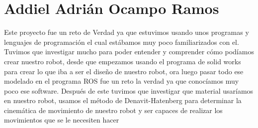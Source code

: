 \section{Addiel Adrián Ocampo Ramos}
Este proyecto fue un reto de Verdad ya que estuvimos usando unos programas y lenguajes de programación el cual estábamos muy poco familiarizados con el. Tuvimos que investigar mucho para poder entender y comprender cómo podíamos crear nuestro robot, desde que empezamos usando el programa de solid works para crear lo que iba a ser el diseño de nuestro robot, ora luego pasar todo ese modelado en el programa ROS fue un reto la verdad ya que conocíamos muy poco ese software. Después de este tuvimos que investigar que material usaríamos en nuestro robot, usamos el método de Denavit-Hatenberg para determinar la cinemática de movimiento de nuestro robot y ser capaces de realizar los movimientos que se le necesiten hacer
